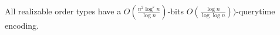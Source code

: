 \begin{contribution}[label=thm:realizable-loglog,restate=TheoremGPTRealizableLogLog]
  All realizable order types have a
  \(O(\frac{n^2\log^\varepsilon n}{\log n})\)-bits
  \(O(\frac{\log{n}}{\log{\log{n}}}))\)-querytime encoding.
\end{contribution}

